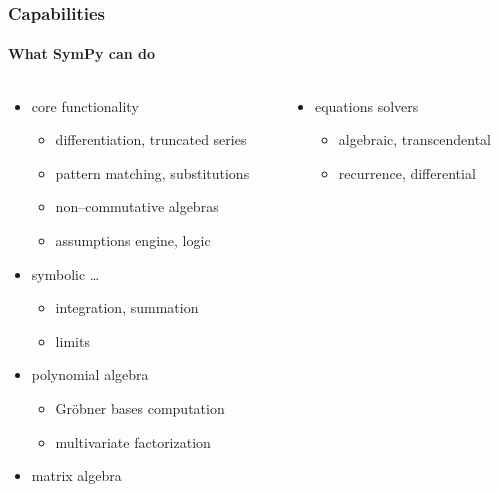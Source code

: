 \documentclass{beamer}
\begin{document}
\begin{frame}[fragile]
    \frametitle{Capabilities}
    \framesubtitle{What SymPy can do}

    \begin{columns}
        \begin{column}[l]{0.5\textwidth}
            \begin{itemize}
                \item core functionality
                    \begin{itemize}
                        \item differentiation, truncated series
                        \item pattern matching, substitutions
                        \item non--commutative algebras
                        \item assumptions engine, logic
                    \end{itemize}
                \item symbolic \ldots
                    \begin{itemize}
                        \item integration, summation
                        \item limits
                    \end{itemize}
                \item polynomial algebra
                    \begin{itemize}
                        \item Gröbner bases computation
                        \item multivariate factorization
                    \end{itemize}
                \item matrix algebra
            \end{itemize}
        \end{column}
        \begin{column}[r]{0.5\textwidth}
            \begin{itemize}
                \item equations solvers
                    \begin{itemize}
                        \item algebraic, transcendental
                        \item recurrence, differential
                    \end{itemize}

\end{itemize}
\end{column}
\end{columns}
\end{frame}
\end{document}

